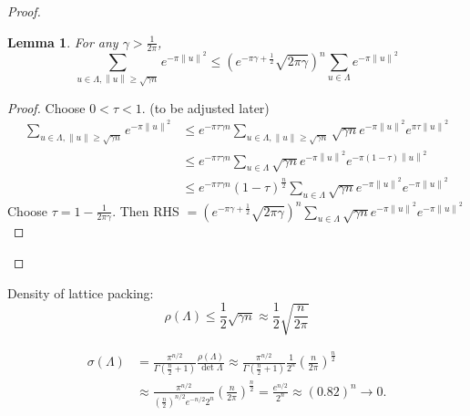 \documentclass{report}
\newcommand{\norm}[1]{\left\| #1 \right\|}
\newtheorem{lemma}{Lemma}[section]
\theoremstyle{definition}
\theoremstyle{remark}
\numberwithin{equation}{section}
\begin{document}
\begin{proof}
    \begin{lemma}
        For any $\gamma > \frac{1}{2\pi}$, \[\sum_{u \in \Lambda, \norm{u}\geq \sqrt{\gamma n}} e^{-\pi\norm{u}^2} \leq \left(e^{-\pi\gamma + \frac{1}{2}}\sqrt{2\pi\gamma}\right)^n \sum_{u \in \Lambda} e^{-\pi\norm{u}^2}\]
    \end{lemma}
    \begin{proof}
        Choose $0 < \tau < 1$. (to be adjusted later)
        \begin{align*}
            \sum_{u \in \Lambda, \norm{u}\geq\sqrt{\gamma n}} e^{-\pi\norm{u}^2} & 
            \leq e^{-\pi\tau\gamma n}\sum_{u \in \Lambda, \norm{u} \geq \sqrt{\gamma n}} \sqrt{\gamma n} e^{-\pi\norm{u}^2} e^{\pi\tau\norm{u}^2} \\
            & \leq e^{-\pi\tau\gamma n}\sum_{u \in \Lambda} \sqrt{\gamma n} e^{-\pi\norm{u}^2} e^{-\pi(1-\tau)\norm{u}^2} \\
            & \leq e^{-\pi\tau\gamma n}(1-\tau)^{\frac{n}{2}} \sum_{u \in \Lambda} \sqrt{\gamma n} e^{-\pi\norm{u}^2} e^{-\pi\norm{u}^2}
        \end{align*}
        Choose $\tau = 1 - \frac{1}{2\pi \gamma}$. Then RHS $= \left(e^{-\pi\gamma + \frac{1}{2}}\sqrt{2\pi\gamma}\right)^n \sum_{u \in \Lambda} \sqrt{\gamma n} e^{-\pi\norm{u}^2} e^{-\pi\norm{u}^2}$
    \end{proof}
\end{proof}

Density of lattice packing: \[
    \rho(\Lambda) \leq \frac{1}{2}\sqrt{\gamma n} \approx \frac{1}{2}\sqrt{\frac{n}{2\pi}}\]
    
    \begin{align*}
        \sigma(\Lambda) & = \frac{\pi^{n/2}}{\Gamma\left(\frac{n}{2}+1\right)}\frac{\rho(\Lambda)}{\det\Lambda} \approx \frac{\pi^{n/2}}{\Gamma\left(\frac{n}{2}+1\right)}\frac{1}{2^n}\left(\frac{n}{2\pi}\right)^{\frac{n}{2}} \\
        & \approx\frac{\pi^{n/2}}{\left(\frac{n}{2}\right)^{n/2}e^{-n/2}2^n}\left(\frac{n}{2\pi}\right)^{\frac{n}{2}} = \frac{e^{n/2}}{2^n} \approx (0.82)^n \to 0.
    \end{align*}
\end{document}
